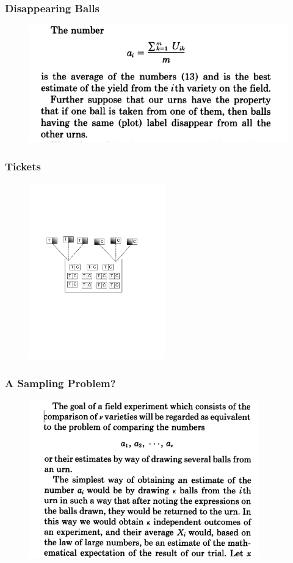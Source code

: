 \documentclass{beamer}
\begin{document}
\begin{frame}[t]\frametitle{Disappearing Balls}
	\begin{figure}[htbp]
		\centering
			\includegraphics[height=2in]{neyman3.png}
		\label{fig:neyman3}
	\end{figure}
\end{frame}

\begin{frame}[t]\frametitle{Tickets}
	\begin{figure}[htbp]
		\centering
			\includegraphics[height=3in]{potential_outcomes.pdf}
\		\label{fig:potential_outcomes}
	\end{figure}	
\end{frame}

\begin{frame}[t]\frametitle{A Sampling Problem?}
	\begin{figure}[htbp]
		\centering
			\includegraphics[height=2.7in]{neyman5.png}
		\label{fig:neyman5}
	\end{figure}
\end{frame}
\end{document}
